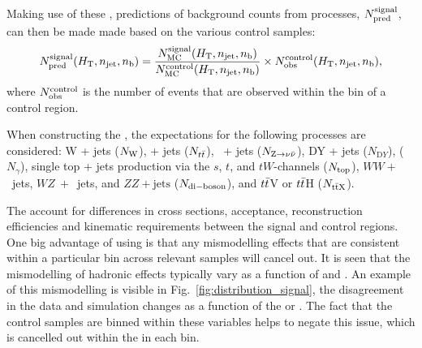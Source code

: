 Making use of these \TFs, predictions of background counts from \SM
processes, $N_{\textrm{pred}}^{\rm signal}$, can then be made made based on the
various control samples:
\begin{equation}
  \label{equ:pred-method}
  N_{\textrm{pred}}^{\rm signal}(\mbox{$H_\text{T}$},n_{\mathrm{jet}},n_{\text{b}}) = \frac{N_{\rm MC}^{\rm
      signal}(\mbox{$H_\text{T}$},n_{\mathrm{jet}},n_{\text{b}})}{N_{\rm MC}^{\rm
      control}(\mbox{$H_\text{T}$},n_{\mathrm{jet}},n_{\text{b}})} \times N_{\textrm{obs}}^{\rm
    control}(\mbox{$H_\text{T}$},n_{\mathrm{jet}},n_{\text{b}}),
\end{equation}
where $N_{\textrm{obs}}^{\rm control}$ is the number of events that are observed
within the bin of a control region.

When constructing the \TFs, the \MC expectations for the following \SM
processes are considered: W + jets ($N_{\rm W}$), \ttbar + jets
($N_{t\bar{t}}$), \znunu\ + jets ($N_{{\text Z} \rightarrow \nu\bar{\nu}}$), DY + jets ($N_{\mathrm
DY}$), \gj ($N_\gamma$), single top + jets production via the $s$,
$t$, and $tW$-channels ($N_{\rm top}$), $WW+$~jets, $WZ~+$~jets, and
$ZZ + \textrm{jets}$ ($N_{\rm di-boson}$), and $t\bar{t}$V or $t\bar{t}$H
($N_{\rm {\ensuremath{t\bar{t}}}X}$). 

The \TFs account for differences in cross sections, acceptance,
reconstruction efficiencies and kinematic requirements between the
signal and control regions. One big advantage of using \TFs is that
any mismodelling effects that are consistent within a particular bin
across relevant \MC samples will cancel out. It is seen that the
mismodelling of hadronic effects typically vary as a function of \HT
and \nj. An example of this mismodelling is visible in
Fig.~\ref{fig:distribution_signal}, the disagreement in the data and
simulation changes as a function of the \HT or \nj. The fact
that the control samples are binned within these variables helps to
negate this issue, which is cancelled out within the \TF in each bin.

